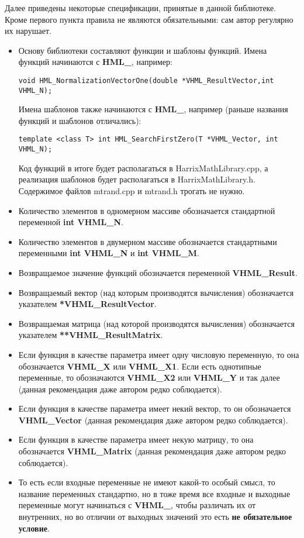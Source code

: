 Далее приведены некоторые спецификации, принятые в данной библиотеке. Кроме первого пункта правила не являются обязательными: сам автор регулярно их нарушает.
\begin{itemize}
\item Основу библиотеки составляют функции и шаблоны функций. Имена функций начинаются с \textbf{HML\_}, например:
\begin{lstlisting}[label=examplename,caption=Пример названия функции]
void HML_NormalizationVectorOne(double *VHML_ResultVector,int VHML_N);
\end{lstlisting}
Имена шаблонов также начинаются с \textbf{HML\_}, например (раньше названия функций и шаблонов отличались):
\begin{lstlisting}[label=examplename2,caption=Пример названия шаблона функции]
template <class T> int HML_SearchFirstZero(T *VHML_Vector, int VHML_N);
\end{lstlisting}
Код функций в итоге будет располагаться в HarrixMathLibrary.cpp, а реализация шаблонов будет располагаться в HarrixMathLibrary.h. Содержимое файлов mtrand.cpp и mtrand.h трогать не нужно.
\item Количество элементов в одномерном массиве обозначается стандартной переменной  \textbf{int VHML\_N}.
\item Количество элементов в двумерном массиве обозначается стандартными переменными  \textbf{int VHML\_N} и \textbf{int VHML\_M}.
\item Возвращаемое значение функций обозначается переменной \textbf{VHML\_Result}.
\item Возвращаемый вектор (над которым производятся вычисления) обозначается указателем \textbf{*VHML\_ResultVector}.
\item Возвращаемая матрица (над которой производятся вычисления) обозначается указателем \textbf{**VHML\_ResultMatrix}.
\item Если функция в качестве параметра имеет одну числовую переменную, то она обозначается \textbf{VHML\_X} или \textbf{VHML\_X1}. Если есть однотипные переменные, то обозначаются \textbf{VHML\_X2} или \textbf{VHML\_Y} и так далее (данная рекомендация даже автором редко соблюдается).
\item Если функция в качестве параметра имеет некий вектор, то он обозначается \textbf{VHML\_Vector} (данная рекомендация даже автором редко соблюдается).
\item Если функция в качестве параметра имеет некую матрицу, то она обозначается \textbf{VHML\_Matrix} (данная рекомендация даже автором редко соблюдается).
\item То есть если входные переменные не имеют какой-то особый смысл, то название переменных стандартно, но в тоже время все входные и выходные переменные могут начинаться с \textbf{VHML\_}, чтобы различать их от внутренних, но во отличии от выходных значений это есть \textbf{не обязательное условие}.
\end{itemize}

